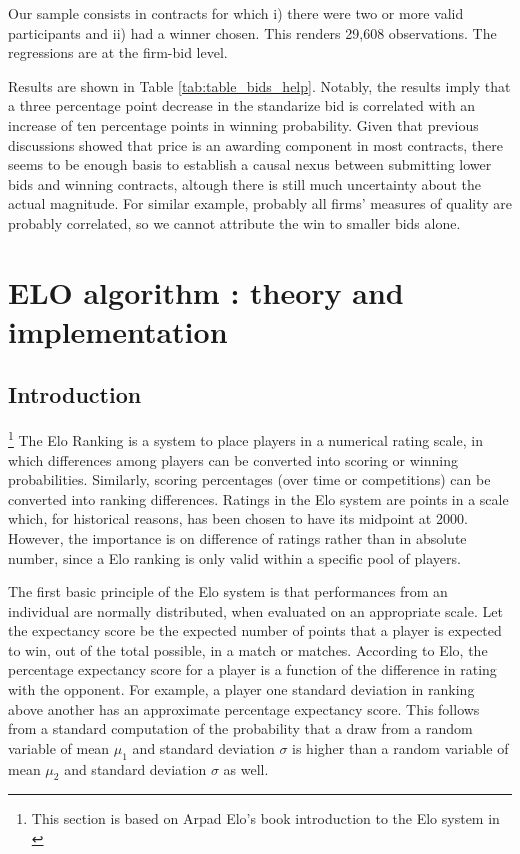 Our sample consists in contracts for which i) there were two or more valid participants and ii) had a winner chosen. This renders 29,608 observations. The regressions are at the firm-bid level.

Results are shown in Table \ref{tab:table_bids_help}. Notably, the results imply that a three percentage point decrease in the standarize bid is correlated with an increase of ten percentage points in winning probability. Given that previous discussions showed that price is an awarding component in most contracts, there seems to be enough basis to establish a causal nexus between submitting lower bids and winning contracts, altough there is still much uncertainty about the actual magnitude. For similar  example, probably all firms' measures of quality are probably correlated, so we cannot attribute the win to smaller bids alone.



\clearpage
\section{ELO algorithm : theory and implementation}
\subsection{Introduction}\footnote{This section is based on Arpad Elo's book introduction to the Elo system in \citep{elo1978rating}}
The Elo Ranking is a system to place players in a numerical rating scale, in which differences among players can be converted into scoring or winning probabilities. Similarly, scoring percentages (over time or competitions) can be converted into ranking differences. Ratings in the Elo system are points in a scale which, for historical reasons, has been chosen to have its midpoint at 2000. However, the importance is on difference of ratings rather than in absolute number, since a Elo ranking is only valid within a specific pool of players.

The first basic principle of the Elo system is that performances from an individual are normally distributed, when evaluated on an appropriate scale. Let the expectancy score be the expected number of points that a player is expected to win, out of the total possible, in a match or matches. According to Elo, the percentage expectancy score for a player is a function of the difference in rating with the opponent. For example, a player one standard deviation in ranking above another has an approximate  percentage expectancy score. This follows from a standard computation of the probability that a draw from a random variable of mean $\mu_1$ and standard deviation $\sigma$ is higher than a random variable of mean $\mu_2$ and standard deviation $\sigma$ as well.

